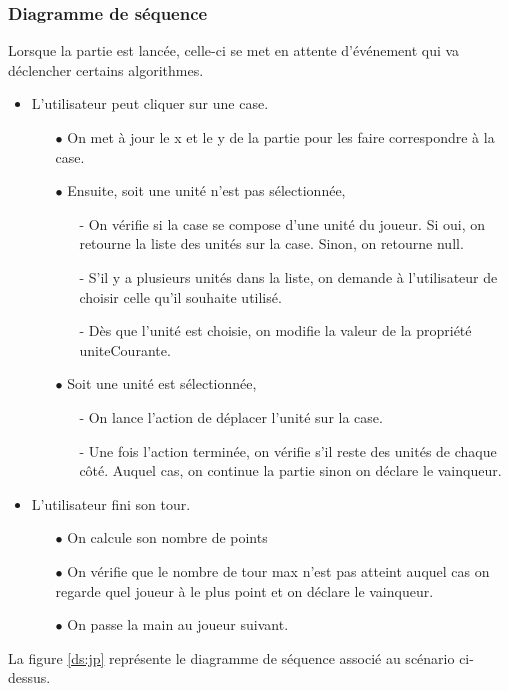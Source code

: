 \documentclass[a4paper,11pt]{article}
\begin{document}
\subsubsection{Diagramme de séquence}
Lorsque la partie est lancée, celle-ci se met en attente d'événement qui va déclencher certains algorithmes.
\begin{itemize}
\item L'utilisateur peut cliquer sur une case.
	\begin{itemize}
	\item[$\bullet$] On met à jour le x et le y de la partie pour les faire correspondre à la case.
	\item[$\bullet$] Ensuite, soit une unité n'est pas sélectionnée,
		\begin{itemize}
		\item[-] On vérifie si la case se compose d'une unité du joueur. Si oui, on retourne la liste des unités sur la case. Sinon, on retourne null.
		\item[-] S'il y a plusieurs unités dans la liste, on demande à l'utilisateur de choisir celle qu'il souhaite utilisé.
		\item[-] Dès que l'unité est choisie, on modifie la valeur de la propriété uniteCourante.
		\end{itemize}
	\item[$\bullet$] Soit une unité est sélectionnée,
		\begin{itemize}
		\item[-] On lance l'action de déplacer l'unité sur la case. 
		\item[-] Une fois l'action terminée, on vérifie s'il reste des unités de chaque côté. Auquel cas, on continue la partie sinon on déclare le vainqueur.
		\end{itemize}
	\end{itemize}
\item L'utilisateur fini son tour.
	\begin{itemize}
	\item[$\bullet$] On calcule son nombre de points
	\item[$\bullet$] On vérifie que le nombre de tour max n'est pas atteint auquel cas on regarde quel joueur à le plus point et on déclare le vainqueur.
	\item[$\bullet$] On passe la main au joueur suivant.
	\end{itemize}
\end{itemize}
La figure \ref{ds:jp} représente le diagramme de séquence associé au scénario ci-dessus.
\end{document}
